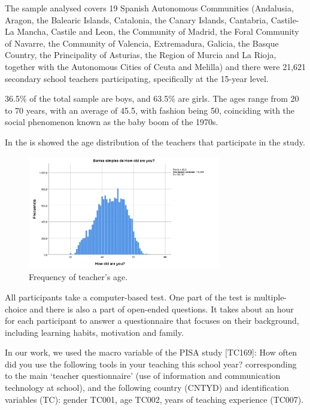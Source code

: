 \documentclass{textolivre}
\begin{document}
The sample analysed covers 19 Spanish Autonomous Communities (Andalusia, Aragon, the Balearic Islands, Catalonia, the Canary Islands, Cantabria, Castile-La Mancha, Castile and Leon, the Community of Madrid, the Foral Community of Navarre, the Community of Valencia, Extremadura, Galicia, the Basque Country, the Principality of Asturias, the Region of Murcia and La Rioja, together with the Autonomous Cities of Ceuta and Melilla) and there were 21,621 secondary school teachers participating, specifically at the 15-year level.

36.5\% of the total sample are boys, and 63.5\% are girls. The ages range from 20 to 70 years, with an average of 45.5, with fashion being 50, coinciding with the social phenomenon known as the baby boom of the 1970s.

In the  is showed the age distribution of the teachers that participate in the study.

\begin{figure}[htbp]
 \centering
 \includegraphics[width=0.75\textwidth]{fig01}
 \caption{Frequency of teacher's age.}
 \label{fig01}
\end{figure}

All participants take a computer-based test. One part of the test is multiple-choice and there is also a part of open-ended questions. It takes about an hour for each participant to answer a questionnaire that focuses on their background, including learning habits, motivation and family.

In our work, we used the macro variable of the PISA study [TC169]: How often did you use the following tools in your teaching this school year? corresponding to the main ‘teacher questionnaire’ (use of information and communication technology at school), and the following country (CNTYD) and identification variables (TC): gender TC001, age TC002, years of teaching experience (TC007).
\end{document}
